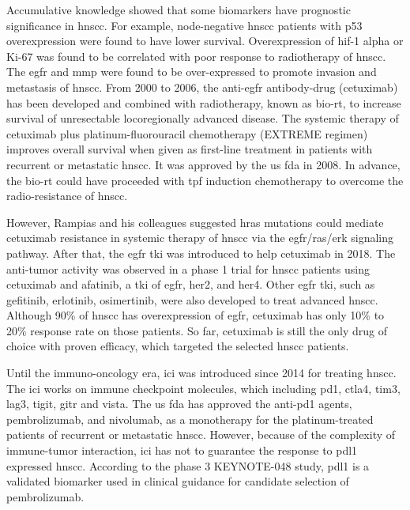 \documentclass[cancers,article,submit,moreauthors,pdftex]{Definitions/mdpi}
\begin{document}
Accumulative knowledge showed that some biomarkers have prognostic significance in \acrshort{hnscc}. For example, node-negative \acrshort{hnscc} patients with p53 overexpression were found to have lower survival\cite{DeVicente2004}.
Overexpression of \acrfull{hif}-1 alpha\cite{Aebersold2001} or Ki-67\cite{Couture2002} was found to be correlated with poor response to radiotherapy of \acrshort{hnscc}. The \acrfull{egfr}\cite{O-Charoenrat2000}\cite{Bentzen2005} and \acrfull{mmp}\cite{Harrington2017} were found to be over-expressed to promote invasion and metastasis of \acrshort{hnscc}.
From 2000 to 2006, the anti-\acrshort{egfr} antibody-drug (cetuximab) has been developed and combined with radiotherapy, known as bio-\acrshort{rt}, to increase survival of unresectable locoregionally advanced disease\cite{Bonner2006a}.
The systemic therapy of cetuximab plus platinum-fluorouracil chemotherapy (EXTREME regimen) improves overall survival when given as first-line treatment in patients with recurrent or metastatic \acrshort{hnscc}\cite{Vermorken2008}\cite{Rivera2009}. It was approved by the \acrshort{us} \acrfull{fda} in 2008. In advance, the bio-\acrshort{rt} could have proceeded with \acrfull{tpf} induction chemotherapy to overcome the radio-resistance of \acrshort{hnscc}\cite{Blanchard2013}.

However, Rampias and his colleagues suggested \acrfull{hras} mutations could mediate cetuximab resistance in systemic therapy of \acrshort{hnscc} via the \acrshort{egfr}/\acrfull{ras}/\acrfull{erk} signaling pathway\cite{Rampias2014}.
After that, the \acrshort{egfr} \acrfull{tki} was introduced to help cetuximab in 2018. The anti-tumor activity was observed in a phase 1 trial for \acrshort{hnscc} patients using cetuximab and afatinib, a \acrshort{tki} of \acrshort{egfr}, \acrfull{her}2, and \acrshort{her}4\cite{Gazzah2018}. Other \acrshort{egfr} \acrshort{tki}, such as gefitinib, erlotinib, osimertinib, were also developed to treat advanced \acrshort{hnscc}.
Although 90\% of \acrshort{hnscc} has overexpression of \acrshort{egfr}, cetuximab has only 10\% to 20\% response rate on those patients. So far, cetuximab is still the only drug of choice with proven efficacy, which targeted the selected \acrshort{hnscc} patients\cite{Taberna2019}.

Until the immuno-oncology era, \acrfull{ici} was introduced since 2014 for treating \acrshort{hnscc}\cite{Seiwert2014}\cite{Swanson2015}.
The \acrshort{ici} works on immune checkpoint molecules, which including \acrfull{pd1}, \acrfull{ctla4}, \acrfull{tim3}, \acrfull{lag3}, \acrfull{tigit}, \acrfull{gitr} and \acrfull{vista}\cite{Mei2020}.
The \acrshort{us} \acrshort{fda} has approved the anti-\acrshort{pd1} agents, pembrolizumab, and nivolumab, as a monotherapy for the platinum-treated patients of recurrent or metastatic \acrshort{hnscc}\cite{Cramer2019}. However, because of the complexity of immune-tumor interaction, \acrshort{ici} has not to guarantee the response to \acrfull{pdl1} expressed \acrshort{hnscc}\cite{Swanson2015}.
According to the phase 3 KEYNOTE-048 study, \acrshort{pdl1} is a validated biomarker used in clinical guidance for candidate selection of pembrolizumab\cite{Burtness2019}\cite{Gavrielatou2020}.
\end{document}
